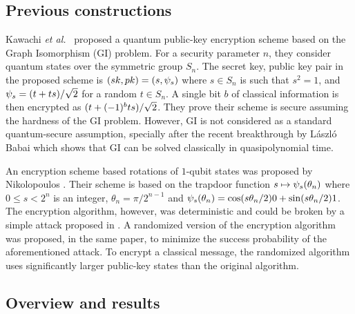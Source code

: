 \documentclass[11pt]{article}
\theoremstyle{plain}
\theoremstyle{definition}
\let\ket\relax
\DeclarePairedDelimiter{\ket}{\lvert}{\rangle}
\begin{document}
\subsection{Previous constructions}

Kawachi \textit{et al.}~\cite{kawachi2005computational, kawachi2012computational} proposed a quantum public-key encryption scheme based on the Graph Isomorphism (GI) problem. For a security parameter $n$, they consider quantum states over the symmetric group $S_n$. The secret key, public key pair in the proposed scheme is $(sk, pk) = (s, \ket{\psi_s})$ where $s \in S_n$ is such that $s^2 = 1$, and $\ket{\psi_s} = (\ket{t} + \ket{ts}) / \sqrt{2}$ for a random $t \in S_n$. A single bit $b$ of classical information is then encrypted as $(\ket{t} + (-1)^b\ket{ts}) / \sqrt{2}$. They prove their scheme is secure assuming the hardness of the GI problem. However, GI is not considered as a standard quantum-secure assumption, specially after the recent breakthrough by L{\'a}szl{\'o} Babai \cite{babai2016graph} which shows that GI can be solved classically in quasipolynomial time.

An encryption scheme based rotations of $1$-qubit states was proposed by Nikolopoulos \cite{nikolopoulos2008applications}. Their scheme is based on the trapdoor function $s \mapsto \ket{\psi_s(\theta_n)}$ where $0 \le s < 2^n$ is an integer, $\theta_n = \pi / 2^{n - 1}$ and $\ket{\psi_s(\theta_n)} = \cos(s\theta_n /2)\ket{0} + \sin(s\theta_n / 2)\ket{1}$. The encryption algorithm, however, was deterministic and could be broken by a simple attack proposed in \cite{nikolopoulos2009deterministic}. A randomized version of the encryption algorithm was proposed, in the same paper, to minimize the success probability of the aforementioned attack. To encrypt a classical message, the randomized algorithm uses significantly larger public-key states than the original algorithm.



\subsection{Overview and results}
\end{document}
